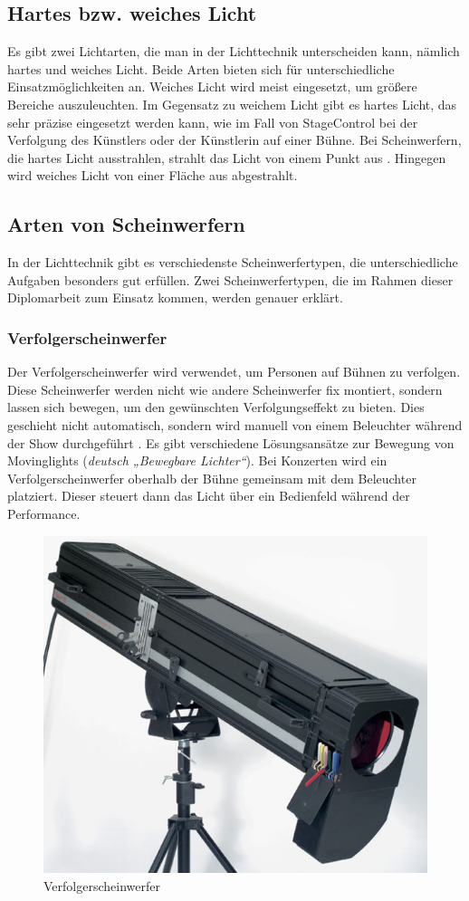 \subsection{Hartes bzw. weiches Licht}
Es gibt zwei Lichtarten, die man in der Lichttechnik unterscheiden kann, nämlich hartes und weiches Licht. Beide Arten bieten sich für unterschiedliche Einsatzmöglichkeiten an. Weiches Licht wird meist eingesetzt, um größere Bereiche auszuleuchten. Im Gegensatz zu weichem Licht gibt es hartes Licht, das sehr präzise eingesetzt werden kann, wie im Fall von StageControl bei der Verfolgung des Künstlers oder der Künstlerin auf einer Bühne. Bei Scheinwerfern, die hartes Licht ausstrahlen, strahlt das Licht von einem Punkt aus \parencite{HartesWeichesLicht}. Hingegen wird weiches Licht von einer Fläche aus abgestrahlt.\\


\subsection{Arten von Scheinwerfern}
In der Lichttechnik gibt es verschiedenste Scheinwerfertypen, die unterschiedliche Aufgaben besonders gut erfüllen. Zwei Scheinwerfertypen, die im Rahmen dieser Diplomarbeit zum Einsatz kommen, werden genauer erklärt.

\subsubsection{Verfolgerscheinwerfer}
Der Verfolgerscheinwerfer wird verwendet, um Personen auf Bühnen zu verfolgen. Diese Scheinwerfer werden nicht wie andere Scheinwerfer fix montiert, sondern lassen sich bewegen, um den gewünschten Verfolgungseffekt zu bieten. Dies geschieht nicht automatisch, sondern wird manuell von einem Beleuchter während der Show durchgeführt \parencite{Verfolgerscheinwerfer}. Es gibt verschiedene Lösungsansätze zur Bewegung von Movinglights (\textit{deutsch „Bewegbare Lichter“}).  Bei Konzerten wird ein Verfolgerscheinwerfer oberhalb der Bühne gemeinsam mit dem Beleuchter platziert. Dieser steuert dann das Licht über ein Bedienfeld während der Performance.\\


\begin{figure}[H]
	\centering
	\includegraphics[width=0.4\linewidth]{images/Verfolgerscheinwerfer.jpg}
	\caption[Verfolgerscheinwerfer]{Verfolgerscheinwerfer}
	\label{fig:Verfolgerscheinwerfer}
\end{figure}

